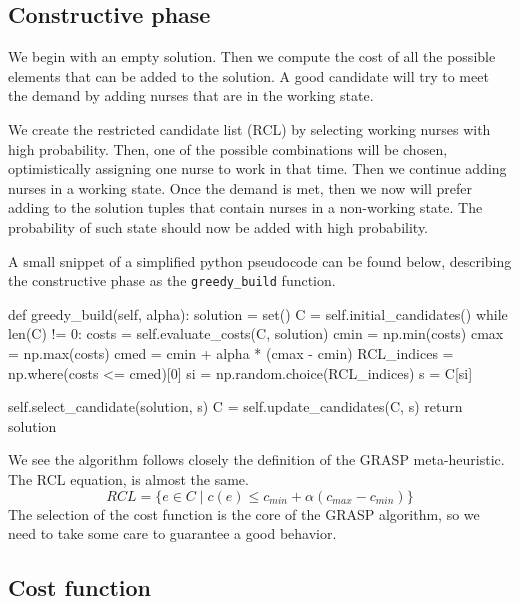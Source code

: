 \documentclass[12pt,a4paper]{article}
\begin{document}
%
\subsection{Constructive phase}
%
We begin with an empty solution. Then we compute the cost of all the possible 
elements that can be added to the solution. A good candidate will try to meet 
the demand by adding nurses that are in the working state.

We create the restricted candidate list (RCL) by selecting working nurses with 
high probability. Then, one of the possible combinations will be chosen, 
optimistically assigning one nurse to work in that time.  Then we continue 
adding nurses in a working state.  Once the demand is met, then we now will 
prefer adding to the solution tuples that contain nurses in a non-working state.  
The probability of such state should now be added with high probability.

A small snippet of a simplified python pseudocode can be found below, describing 
the constructive phase as the \texttt{greedy\_build} function.
%
\begin{pycode}
def greedy_build(self, alpha):
	solution = set()
	C = self.initial_candidates()
	while len(C) != 0:
		costs = self.evaluate_costs(C, solution)
		cmin = np.min(costs)
		cmax = np.max(costs)
		cmed = cmin + alpha * (cmax - cmin)
		RCL_indices = np.where(costs <= cmed)[0]
		si = np.random.choice(RCL_indices)
		s = C[si]

		self.select_candidate(solution, s)
		C = self.update_candidates(C, s)
	return solution
\end{pycode}
%
We see the algorithm follows closely the definition of the GRASP meta-heuristic.  
The RCL equation, is almost the same.
$$
	RCL = \{e \in C \mid c(e) \le c_{min} + \alpha (c_{max} - c_{min})\}
$$
The selection of the cost function is the core of the GRASP algorithm, so we
need to take some care to guarantee a good behavior.

\subsection{Cost function}
\end{document}

